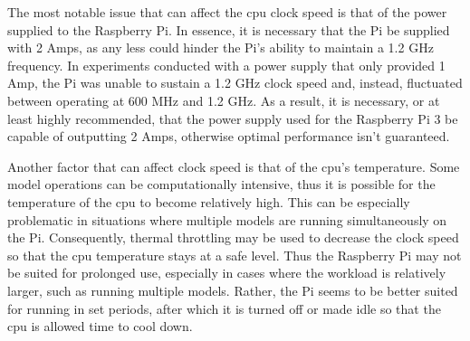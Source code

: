The most notable issue that can affect the cpu clock speed is that of
the power supplied to the Raspberry Pi. In essence, it is necessary
that the Pi be supplied with 2 Amps, as any less could hinder the Pi's
ability to maintain a 1.2 GHz frequency. In experiments conducted with
a power supply that only provided 1 Amp, the Pi was unable to sustain
a 1.2 GHz clock speed and, instead, fluctuated between operating at
600 MHz and 1.2 GHz. As a result, it is necessary, or at least highly
recommended, that the power supply used for the Raspberry Pi 3 be
capable of outputting 2 Amps, otherwise optimal performance isn't
guaranteed.

Another factor that can affect clock speed is that of the
cpu's temperature. Some model operations can be computationally
intensive, thus it is possible for the temperature of the cpu to
become relatively high. This can be especially problematic in
situations where multiple models are running  simultaneously on the
Pi. Consequently, thermal throttling may be used to decrease the clock
speed so that the cpu temperature stays at a safe level. Thus the
Raspberry Pi may not be suited for prolonged use, especially in cases
where the workload is relatively larger, such as running multiple
models. Rather, the Pi seems to be better suited for running in set
periods, after which it is turned  off or made idle so that the cpu is
allowed time to cool down. 

